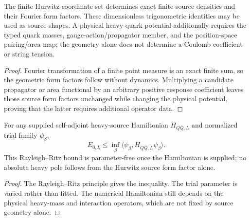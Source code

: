 \documentclass[12pt,a4paper]{article}
\begin{document}
\begin{theorem}
\label{p11:thm:finite-hurwitz-heavy-source-kernel-package}

The finite Hurwitz coordinate set determines exact finite source densities and their Fourier form factors.  These dimensionless trigonometric identities may be used as source shapes.  A physical heavy-quark potential additionally requires the typed quark masses, gauge-action/propagator member, and the position-space pairing/area map; the geometry alone does not determine a Coulomb coefficient or string tension.
\label{p11:eq:hurwitz-heavy-source-density}
\label{p11:eq:hurwitz-heavy-source-form-factor}
\label{p11:eq:hurwitz-heavy-source-swave-density-kernel}
\label{p11:eq:hurwitz-heavy-kinetic-symbol}
\label{p11:eq:finite-hurwitz-coulomb-kernel}
\label{p11:eq:finite-hurwitz-flux-profile}
\label{p11:eq:finite-hurwitz-raw-flux-length}
\label{p11:eq:finite-hurwitz-flux-average-A}
\label{p11:eq:finite-hurwitz-flux-subtraction}
\label{p11:eq:finite-hurwitz-heavy-kernel-substitutions}
\end{theorem}
\begin{proof}

Fourier transformation of a finite point measure is an exact finite sum, so the geometric form factors follow without dynamics.  Multiplying a candidate propagator or area functional by an arbitrary positive response coefficient leaves those source form factors unchanged while changing the physical potential, proving that the latter requires additional operator data.
\end{proof}

\begin{corollary}
\label{p11:cor:leading-finite-heavy-1s-variational-readout}

For any supplied self-adjoint heavy-source Hamiltonian \(H_{Q\bar Q,L}\) and normalized trial family \(\psi_\beta\),
\[
E_{0,L}\le \inf_\beta\langle\psi_\beta,H_{Q\bar Q,L}\psi_\beta\rangle.
\]
This Rayleigh--Ritz bound is parameter-free once the Hamiltonian is supplied; no absolute heavy pole follows from the Hurwitz source form factor alone.
\label{p11:eq:leading-finite-heavy-1s-functional}
\label{p11:eq:finite-heavy-1s-spin-average}
\end{corollary}
\begin{proof}

The Rayleigh--Ritz principle gives the inequality.  The trial parameter is varied rather than fitted.  The numerical Hamiltonian still depends on the physical heavy-mass and interaction operators, which are not fixed by source geometry alone.
\end{proof}
\end{document}
